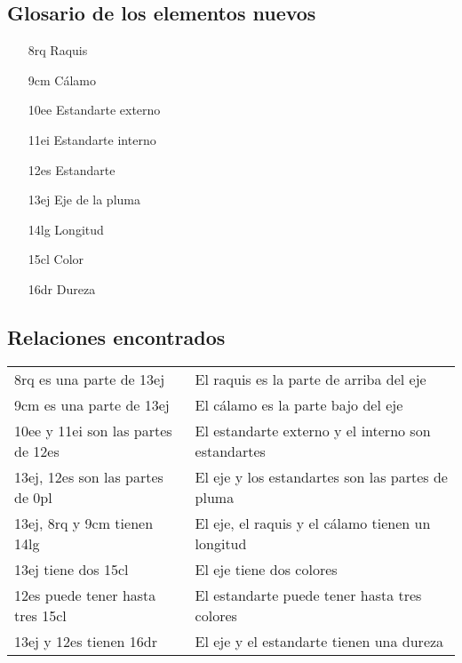 \documentclass[a4paper,12pt]{article}
\begin{document}
\subsection{Glosario de los elementos nuevos}
\begin{itemize}
	\item[8rq] Raquis
	\item[9cm] Cálamo
	\item[10ee] Estandarte externo
	\item[11ei] Estandarte interno
	\item[12es] Estandarte
	\item[13ej] Eje de la pluma
	\item[14lg] Longitud
	\item[15cl] Color
	\item[16dr] Dureza
\end{itemize}

\subsection{Relaciones encontrados}
\begin{table}[H]
	\centering
	\begin{tabular}{ll}
		8rq es una parte de 13ej	& El raquis es la parte de arriba del eje	\\
		9cm es una parte de 13ej	& El cálamo es la parte bajo del eje \\
		10ee y 11ei son las partes de 12es	& El estandarte externo y el interno son estandartes \\
		13ej, 12es son las partes de 0pl	& El eje y los estandartes son las partes de pluma \\
		13ej, 8rq y 9cm tienen 14lg	& El eje, el raquis y el cálamo tienen un longitud \\
		13ej tiene dos 15cl	& El eje tiene dos colores \\
		12es puede tener hasta tres 15cl	& El estandarte puede tener hasta tres colores \\
		13ej y 12es tienen 16dr	& El eje y el estandarte tienen una dureza
	\end{tabular}
\end{table}
\end{document}
